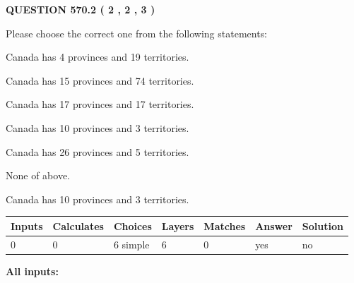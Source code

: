 \documentclass[12pt]{article}
\begin{document}
   
  
\vspace{0.2in}
  
{\textbf{\Large{QUESTION
570.2 
 ( 2 , 2 , 3 )
}}}
  
  
Please choose the correct one from the following statements:
 
 
Canada has   4 provinces and  19 territories.
 
 
Canada has  15 provinces and  74 territories.
 
 
Canada has  17 provinces and  17 territories.
 
 
Canada has 10  provinces and 3 territories.
 
 
Canada has  26 provinces and  5 territories.
 
 
 None of above.
 
 
\noindent{}
 
 
Canada has 10  provinces and 3 territories.
 
 
\noindent{}
 
 
   
   
   
   
\noindent\begin{tabular}{|l|l|l|l|l|l|l|}
 \hline
Inputs & Calculates & Choices & Layers & Matches & Answer & Solution \\ \hline
 0  & 
 0  & 
 6
  simple  
  & 
 6  & 
 0  & 
  yes & 
  no 
  \\ \hline
 \end{tabular}
   
   
   
   
\noindent{}
   
   
   
   
\noindent\vspace{0.1in}\hspace{-0.08in} {\textbf{\Large{All inputs: }}}
   
   
   
   
   
   
 \vspace{0.2in}
 
\end{document}
